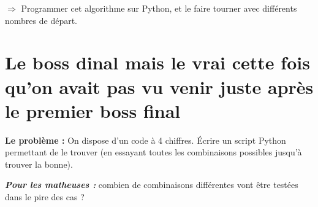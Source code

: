 \documentclass[12pt,a4paper, oneside]{article}
\begin{document}
  $\Longrightarrow$ Programmer cet algorithme sur Python, et le faire tourner avec différents nombres de départ.

\section*{Le boss dinal mais le vrai cette fois qu'on avait pas vu venir juste après le premier boss final}
  \textbf{Le problème :} On dispose d'un code à 4 chiffres.
  Écrire un script Python permettant de le trouver (en essayant toutes les combinaisons possibles jusqu'à trouver la bonne).

  \textbf{\textit{Pour les matheuses :}} combien de combinaisons différentes vont être testées dans le pire des cas ?
\end{document}
